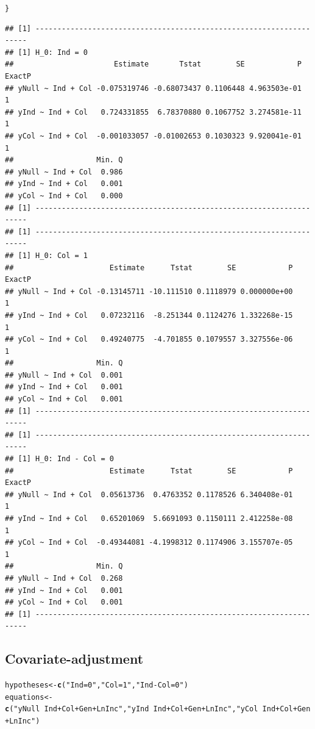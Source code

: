 \documentclass[11pt, a4paper]{article}\usepackage[]{graphicx}\usepackage[]{color}
\makeatletter
\newcommand{\hlstr}[1]{\textcolor[rgb]{0.192,0.494,0.8}{#1}}%
\newcommand{\hlstd}[1]{\textcolor[rgb]{0.345,0.345,0.345}{#1}}%
\newcommand{\hlkwb}[1]{\textcolor[rgb]{0.69,0.353,0.396}{#1}}%
\newcommand{\hlkwd}[1]{\textcolor[rgb]{0.737,0.353,0.396}{\textbf{#1}}}%
\newenvironment{kframe}{%
 \def\at@end@of@kframe{}%
 \ifinner\ifhmode%
  \def\at@end@of@kframe{\end{minipage}}%
  \begin{minipage}{\columnwidth}%
 \fi\fi%
 \def\FrameCommand##1{\hskip\@totalleftmargin \hskip-\fboxsep
 \colorbox{shadecolor}{##1}\hskip-\fboxsep
     \hskip-\linewidth \hskip-\@totalleftmargin \hskip\columnwidth}%
 \MakeFramed {\advance\hsize-\width
   \@totalleftmargin\z@ \linewidth\hsize
   \@setminipage}}%
 {\par\unskip\endMakeFramed%
 \at@end@of@kframe}
\newenvironment{knitrout}{}{} %
\makeatother
\begin{document}
\begin{footnotesize}
\begin{knitrout}
\begin{kframe}
\begin{alltt}
    \hlstd{\}}
\end{alltt}
\begin{verbatim}
## [1] --------------------------------------------------------------------
## [1] H_0: Ind = 0
##                       Estimate       Tstat        SE            P ExactP
## yNull ~ Ind + Col -0.075319746 -0.68073437 0.1106448 4.963503e-01      1
## yInd ~ Ind + Col   0.724331855  6.78370880 0.1067752 3.274581e-11      1
## yCol ~ Ind + Col  -0.001033057 -0.01002653 0.1030323 9.920041e-01      1
##                   Min. Q
## yNull ~ Ind + Col  0.986
## yInd ~ Ind + Col   0.001
## yCol ~ Ind + Col   0.000
## [1] --------------------------------------------------------------------
## [1] --------------------------------------------------------------------
## [1] H_0: Col = 1
##                      Estimate      Tstat        SE            P ExactP
## yNull ~ Ind + Col -0.13145711 -10.111510 0.1118979 0.000000e+00      1
## yInd ~ Ind + Col   0.07232116  -8.251344 0.1124276 1.332268e-15      1
## yCol ~ Ind + Col   0.49240775  -4.701855 0.1079557 3.327556e-06      1
##                   Min. Q
## yNull ~ Ind + Col  0.001
## yInd ~ Ind + Col   0.001
## yCol ~ Ind + Col   0.001
## [1] --------------------------------------------------------------------
## [1] --------------------------------------------------------------------
## [1] H_0: Ind - Col = 0
##                      Estimate      Tstat        SE            P ExactP
## yNull ~ Ind + Col  0.05613736  0.4763352 0.1178526 6.340408e-01      1
## yInd ~ Ind + Col   0.65201069  5.6691093 0.1150111 2.412258e-08      1
## yCol ~ Ind + Col  -0.49344081 -4.1998312 0.1174906 3.155707e-05      1
##                   Min. Q
## yNull ~ Ind + Col  0.268
## yInd ~ Ind + Col   0.001
## yCol ~ Ind + Col   0.001
## [1] --------------------------------------------------------------------
\end{verbatim}
\end{kframe}
\end{knitrout}

    \subsection{Covariate-adjustment}

\begin{knitrout}
\color{fgcolor}\begin{kframe}
\begin{alltt}
    \hlstd{hypotheses} \hlkwb{<-} \hlkwd{c}\hlstd{(}\hlstr{"Ind = 0"}\hlstd{,} \hlstr{"Col = 1"}\hlstd{,} \hlstr{"Ind - Col = 0"}\hlstd{)}
    \hlstd{equations} \hlkwb{<-} \hlkwd{c}\hlstd{(}\hlstr{"yNull ~ Ind + Col + Gen + LnInc"}\hlstd{,} \hlstr{"yInd ~ Ind + Col + Gen + LnInc"}\hlstd{,} \hlstr{"yCol ~ Ind + Col + Gen + LnInc"}\hlstd{)}


\end{alltt}
\end{kframe}
\end{knitrout}
\end{footnotesize}
\end{document}
